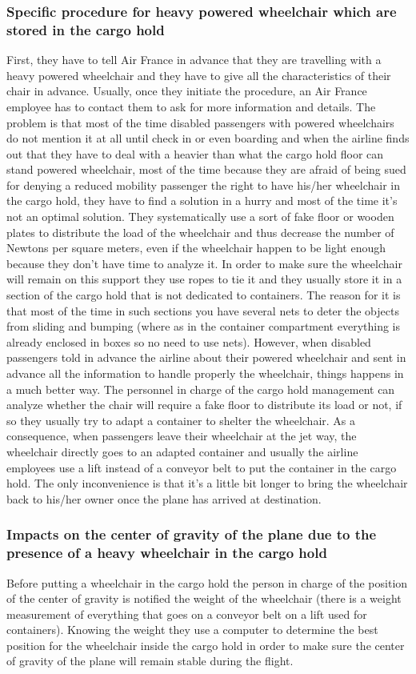 \subsubsection*{Specific procedure for heavy powered wheelchair which are stored in the cargo hold}
First, they have to tell Air France in advance that they are travelling with a heavy powered wheelchair and they have to give all the characteristics of their chair in advance. Usually, once they initiate the procedure, an Air France employee has to contact them to ask for more information and details.
The problem is that most of the time disabled passengers with powered wheelchairs do not mention it at all until check in or even boarding and when the airline finds out that they have to deal with a heavier than what the cargo hold floor can stand powered wheelchair, most of the time because they are afraid of being sued for denying a reduced mobility passenger the right to have his/her wheelchair in the cargo hold, they have to find a solution in a hurry and most of the time it’s not an optimal solution. They systematically use a sort of fake floor or wooden plates to distribute the load of the wheelchair and thus decrease the number of Newtons per square meters, even if the wheelchair happen to be light enough because they don’t have time to analyze it. In order to make sure the wheelchair will remain on this support they use ropes to tie it and they usually store it in a section of the cargo hold that is not dedicated to containers. The reason for it is that most of the time in such sections you have several nets to deter the objects from sliding and bumping (where as in the container compartment everything is already enclosed in boxes so no need to use nets).
However, when disabled passengers told in advance the airline about their powered wheelchair and sent in advance all the information to handle properly the wheelchair, things happens in a much better way. The personnel in charge of the cargo hold management can analyze whether the chair will require a fake floor to distribute its load or not, if so they usually try to adapt a container to shelter the wheelchair. As a consequence, when passengers leave their wheelchair at the jet way, the wheelchair directly goes to an adapted container and usually the airline employees use a lift instead of a conveyor belt to put the container in the cargo hold. The only inconvenience is that it’s a little bit longer to bring the wheelchair back to his/her owner once the plane has arrived at destination.

\subsubsection*{Impacts on the center of gravity of the plane due to the presence of a heavy wheelchair in the cargo hold}
Before putting a wheelchair in the cargo hold the person in charge of the position of the center of gravity is notified the weight of the wheelchair (there is a weight measurement of everything that goes on a conveyor belt on a lift used for containers). Knowing the weight they use a computer to determine the best position for the wheelchair inside the cargo hold in order to make sure the center of gravity of the plane will remain stable during the flight.

